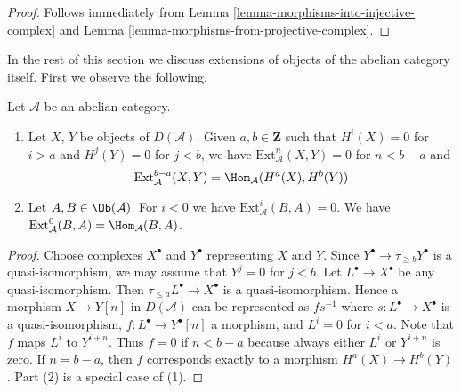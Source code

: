 \begin{proof}
Follows immediately from
Lemma \ref{lemma-morphisms-into-injective-complex}
and
Lemma \ref{lemma-morphisms-from-projective-complex}.
\end{proof}

\noindent
In the rest of this section we discuss extensions of objects of the
abelian category itself. First we observe the following.

\begin{lemma}
\label{lemma-negative-exts}
Let $\mathcal{A}$ be an abelian category.
\begin{enumerate}
\item Let $X$, $Y$ be objects of $D(\mathcal{A})$. Given $a, b \in \mathbf{Z}$
such that $H^i(X) = 0$ for $i > a$ and $H^j(Y) = 0$
for $j < b$, we have $\text{Ext}^n_\mathcal{A}(X, Y) = 0$ for
$n < b - a$ and
$$
\text{Ext}^{b - a}_\mathcal{A}(X, Y) = \Hom_\mathcal{A}(H^a(X), H^b(Y))
$$
\item Let $A, B \in \Ob(\mathcal{A})$.
For $i < 0$ we have $\text{Ext}^i_\mathcal{A}(B, A) = 0$.
We have $\text{Ext}^0_\mathcal{A}(B, A) = \Hom_\mathcal{A}(B, A)$.
\end{enumerate}
\end{lemma}

\begin{proof}
Choose complexes $X^\bullet$ and $Y^\bullet$ representing $X$ and $Y$.
Since $Y^\bullet \to \tau_{\geq b}Y^\bullet$ is a quasi-isomorphism,
we may assume that $Y^j = 0$ for $j < b$.
Let $L^\bullet \to X^\bullet$ be any quasi-isomorphism.
Then $\tau_{\leq a}L^\bullet \to X^\bullet$
is a quasi-isomorphism. Hence a morphism $X \to Y[n]$
in $D(\mathcal{A})$ can be represented as $fs^{-1}$ where
$s : L^\bullet \to X^\bullet$ is a quasi-isomorphism,
$f : L^\bullet \to Y^\bullet[n]$ a morphism, and
$L^i = 0$ for $i < a$. Note that $f$ maps $L^i$ to $Y^{i + n}$.
Thus $f = 0$ if $n < b - a$ because always either $L^i$ or $Y^{i + n}$ is
zero. If $n = b - a$, then $f$ corresponds exactly to a morphism
$H^a(X) \to H^b(Y)$. Part (2) is a special case of (1).
\end{proof}


